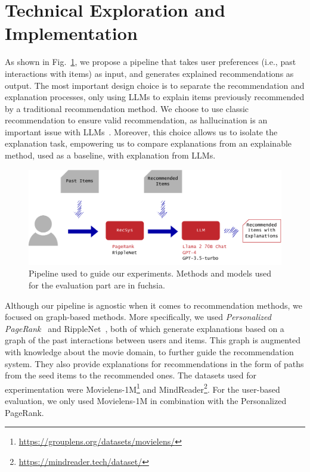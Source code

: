 \section{Technical Exploration and Implementation}

As shown in Fig.~\ref{fig:Pipeline}, we propose a pipeline that takes user preferences (i.e., past interactions with items) as input, and generates explained recommendations as output.
The most important design choice is to separate the recommendation and explanation processes, only using LLMs to explain items previously recommended by a traditional recommendation method. %
We choose to use classic recommendation to ensure valid recommendation, as hallucination is an important issue with LLMs~\cite{ji2023hallucination}. Moreover, this choice allows us to isolate the explanation task, empowering us to compare explanations from an explainable method, used as a baseline, with explanation from LLMs.

\begin{figure}[!ht]
    \centering
    \includegraphics[width=\linewidth]{images/Pipeline.pdf}
    \caption{Pipeline used to guide our experiments. Methods and models used for the evaluation part are in fuchsia.}
    \label{fig:Pipeline}
\end{figure}


Although our pipeline is agnostic when it comes to recommendation methods, we focused on graph-based methods. More specifically, we used \textit{Personalized PageRank}~\cite{haveliwala2003personalizedpagerank} and RippleNet~\cite{wang2018ripplenet}, both of which generate explanations based on a graph of the past interactions between users and items. This graph is augmented with knowledge about the movie domain, to further guide the recommendation system. %
They also provide explanations for recommendations in the form of paths from the seed items to the recommended ones. The datasets used for experimentation were Movielens-1M\footnote{\url{https://grouplens.org/datasets/movielens/}} and MindReader\footnote{\url{https://mindreader.tech/dataset/}}. For the user-based evaluation, we only used Movielens-1M in combination with the Personalized PageRank.

